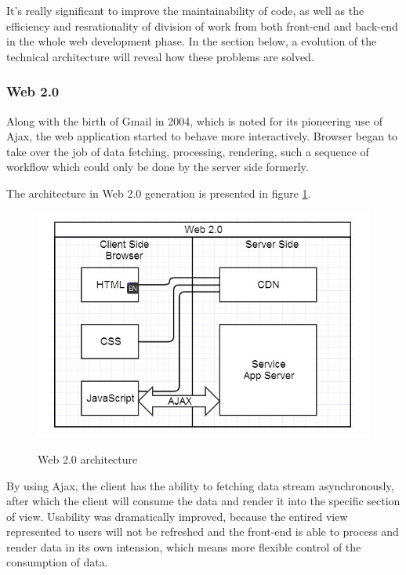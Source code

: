 It's really significant to improve the maintainability of code, as well as the efficiency and resrationality of division of work from both front-end and back-end in the whole web development phase. In the section below, a evolution of the technical architecture will reveal how these problems are solved.

\subsubsection{Web 2.0}
Along with the birth of Gmail\footnotemark[1]  in 2004, which is noted for its pioneering use of \gls{Ajax}, the web application started to behave more interactively. Browser began to take over the job of data fetching, processing, rendering, such a sequence of workflow which could only be done by the server side formerly.

The architecture in Web 2.0 generation is presented in figure \ref{fig:3.2}.

\begin{figure}[!htbp]
  \caption{Web 2.0 architecture}
  \centering
    \includegraphics[width=1\textwidth]{Figures/3_2.png}
  \label{fig:3.2}
\end{figure}

By using Ajax, the client has the ability to fetching data stream asynchronously, after which the client will consume the data and render it into the specific section of view. Usability was dramatically improved, because the entired view represented to users will not be refreshed and the front-end is able to process and render data in its own intension, which means more flexible control of the consumption of data.

